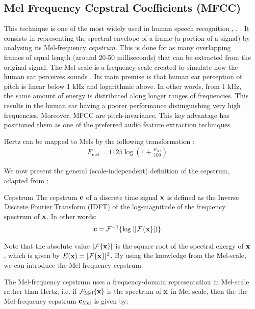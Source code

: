 \documentclass[../main.tex]{subfiles} \label{chapter_soa}
\begin{document}
\subsection{Mel Frequency Cepstral Coefficients (MFCC)} \label{subsection_mfcc}
\par This technique is one of the most widely used in human speech recognition \cite{Jurafsky2009}, \cite{Chou2008a}, \cite{Stowell2014}. It consists in representing the spectral envelope of a frame (a portion of a signal) by analysing its Mel-frequency \emph{cepstrum}. This is done for as many overlapping frames of equal length (around 20-50 milliseconds) that can be extracted from the original signal. The Mel scale is a frequency scale created to simulate how the human ear perceives sounds \cite{Sludge2000}. Its main premise is that human ear perception of pitch is linear below 1 kHz and logarithmic above. In other words, from 1 kHz, the same amount of energy is distributed along longer ranges of frequencies. This results in the human ear having a poorer performance distinguishing very high frequencies. Moreover, MFCC are pitch-invariance. This key advantage has positioned them as one of the preferred audio feature extraction techniques.
\par Hertz can be mapped to Mels by the following transformation \cite{Lyons2014}:
\begin{align*}
F_{\text{mel}} = 1125 \log{(1 + \frac{F_{Hz}}{700})}
\end{align*}
\par We now present the general (scale-independent) definition of the cepstrum, adapted from \cite{Gutierrez-Osuna2009}:
\begin{definition}{Cepstrum} \label{def_cepstrum}
The cepstrum $\mathbf{c}$ of a discrete time signal $\mathbf{x}$ is defined as the Inverse Discrete Fourier Transform (IDFT) of the log-magnitude of the frequency spectrum of $\mathbf{x}$. In other words:
\begin{align*}
\mathbf{c} = \mathcal{F}^{-1}\{\log{(\lvert\mathcal{F}\{\mathbf{x}\}\rvert)}\}
\end{align*}
\end{definition}
\par Note that the absolute value $\lvert\mathcal{F}\{\mathbf{x}\}\rvert$ is the square root of the spectral energy of $\mathbf{x}$, which is given by $E(\mathbf{x}) = \lvert\mathcal{F}\{\mathbf{x}\}\rvert^2$. By using the knowledge from the Mel-scale, we can introduce the Mel-frequency cepstrum. 
\par The Mel-frequency cepstrum uses a frequency-domain representation in Mel-scale rather than Hertz, i.e. if $\mathcal{F_{\text{Mel}}\{\mathbf{x}\}}$ is the spectrum of $\mathbf{x}$ in Mel-scale, then the the Mel-frequency cepstrum $\mathbf{c}_{\text{Mel}}$ is given by:
\end{document}
